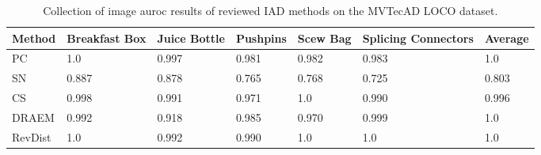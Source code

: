 \begin{table}[htbp]
    \tiny
    \centering
    \begin{tabularx}{\textwidth}{|X|X|X|X|X|X|X|}%
        \hline
        \textbf{Method} & \textbf{Breakfast Box} & \textbf{Juice Bottle} & \textbf{Pushpins} & \textbf{Scew Bag} & \textbf{Splicing Connectors} & \textbf{Average} \\
        \hline
        PC \cite{patchCore2022} & 1.0 & 0.997 & 0.981 & 0.982 & 0.983 & 1.0 \\
        \hline
        SN \cite{liu2023simplenet} & 0.887 & 0.878 & 0.765 & 0.768 & 0.725 & 0.803 \\
        \hline
        CS \cite{csflow2022} & 0.998 & 0.991 & 0.971 & 1.0 & 0.990 & 0.996 \\
        \hline
        DRAEM \cite{Zavrtanik_2021DRAEM} & 0.992 & 0.918 & 0.985 & 0.970 & 0.999 & 1.0 \\
        \hline
        RevDist \cite{revdist2023} & 1.0 & 0.992 & 0.990 & 1.0 & 1.0 & 1.0 \\
        \hline
    \end{tabularx}
    \caption{Collection of image auroc results of reviewed IAD methods on the MVTecAD LOCO \cite{LOCODentsAndScratchesBergmann2022} dataset.}
    \label{tab:imageaurocloco}
\end{table}